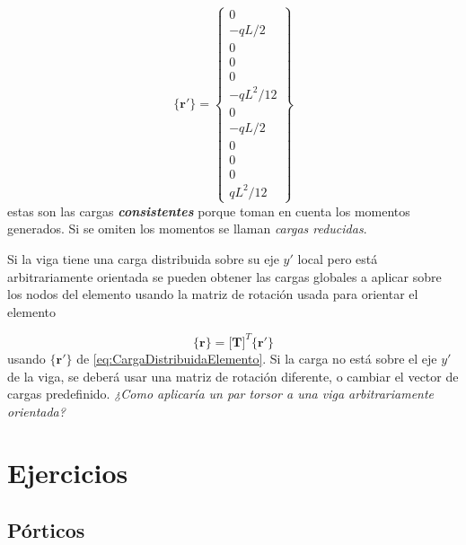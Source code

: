 \documentclass[11pt, a4paper,titlepage]{article}
\newcommand{\Mme}[1]{\boldsymbol{[}\mathbf{#1} \boldsymbol{]}}
\newcommand{\Cme}[1]{\boldsymbol{\{ }\mathbf{#1} \boldsymbol{\}} }
\begin{document}
\begin{equation} \label{eq:CargaDistribuidaElemento}
	\Cme{r'} = \begin{Bmatrix}
	0 \\
	-qL/2 \\
	0\\
	0\\
	0\\
	-qL^2/12\\
	0\\
	-qL/2 \\
	0\\
	0\\
	0\\
	qL^2/12
	\end{Bmatrix}
\end{equation}
estas son las cargas \textbf{\textit{consistentes}} porque toman en cuenta los momentos generados. Si se omiten los momentos se llaman \textit{cargas reducidas}.

Si la viga tiene una carga distribuida sobre su eje $y'$ local pero está arbitrariamente orientada se pueden obtener las cargas globales a aplicar sobre los nodos del elemento usando la matriz de rotación usada para orientar el elemento

\begin{equation}
	\Cme{r}= \Mme{T}^T \Cme{r'}
\end{equation}
usando $\Cme{r'}$ de \eqref{eq:CargaDistribuidaElemento}. Si la carga no está sobre el eje $y'$ de la viga, se deberá usar una matriz de rotación diferente, o cambiar el vector de cargas predefinido. \textit{¿Como aplicaría un par torsor a una viga arbitrariamente orientada?}

\section{Ejercicios}
\subsection*{Pórticos}
\end{document}
